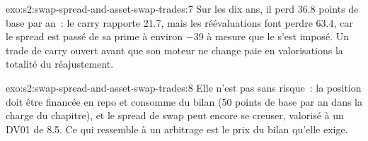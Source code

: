 \begin{solution}{exo:s2:swap-spread-and-asset-swap-trades:7}
Sur les dix ans, il perd 36.8 points de base par an~: le carry rapporte 21.7, mais les réévaluations font perdre 63.4, car le spread est passé de sa prime à environ
$-39$ à mesure que le  s'est imposé. Un trade de carry ouvert avant que son moteur ne change paie en valorisations la totalité du réajustement.
\end{solution}

\begin{solution}{exo:s2:swap-spread-and-asset-swap-trades:8}
Elle n'est pas sans risque~: la position doit être financée en repo et consomme du bilan (50 points de base par an dans la charge du chapitre), et le spread de swap
peut encore se creuser, valorisé à un DV01 de 8.5. Ce qui ressemble à un arbitrage est le prix du bilan qu'elle exige.
\end{solution}

